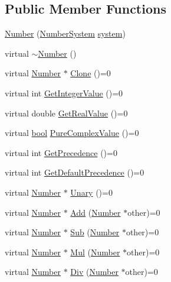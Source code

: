 \subsection*{Public Member Functions}
\begin{DoxyCompactItemize}
\item 
\hyperlink{structNumber_afd3c2f9b4b288e339f741a6e4ae54593}{Number} (\hyperlink{numb_8h_a1475a201d2346881ce88dfbacf628c7d}{Number\+System} \hyperlink{structNumber_a2ceda5601c42288626e76b06878e7476}{system})
\item 
virtual \hyperlink{structNumber_abafeb830a1397e50435815a183228739}{$\sim$\+Number} ()
\item 
virtual \hyperlink{structNumber}{Number} $\ast$ \hyperlink{structNumber_af59101b8a549616be51212fa1c17785e}{Clone} ()=0
\item 
virtual int \hyperlink{structNumber_aa2c4b207ac557a8bdbc1cf5696d37160}{Get\+Integer\+Value} ()=0
\item 
virtual double \hyperlink{structNumber_a83da654d465f1344162ce8b8f8c564b9}{Get\+Real\+Value} ()=0
\item 
virtual \hyperlink{platform_8h_a1062901a7428fdd9c7f180f5e01ea056}{bool} \hyperlink{structNumber_a037b461c2c9189c00b11f395a325735d}{Pure\+Complex\+Value} ()=0
\item 
virtual int \hyperlink{structNumber_a283da553cc9b328c3805611f2d96523d}{Get\+Precedence} ()=0
\item 
virtual int \hyperlink{structNumber_a63541fd80102c9fc36f8f913446700df}{Get\+Default\+Precedence} ()=0
\item 
virtual \hyperlink{structNumber}{Number} $\ast$ \hyperlink{structNumber_a4283e401f772614fc566db78087cf860}{Unary} ()=0
\item 
virtual \hyperlink{structNumber}{Number} $\ast$ \hyperlink{structNumber_af38172a47d725f10b8586846cb06e8a4}{Add} (\hyperlink{structNumber}{Number} $\ast$other)=0
\item 
virtual \hyperlink{structNumber}{Number} $\ast$ \hyperlink{structNumber_ae64075f6f73ded559499d3156bde0bdb}{Sub} (\hyperlink{structNumber}{Number} $\ast$other)=0
\item 
virtual \hyperlink{structNumber}{Number} $\ast$ \hyperlink{structNumber_ab853199817c9cd4e43c43aaedc4eef35}{Mul} (\hyperlink{structNumber}{Number} $\ast$other)=0
\item 
virtual \hyperlink{structNumber}{Number} $\ast$ \hyperlink{structNumber_a63917f8ad27c63f6616107d480ef9b5e}{Div} (\hyperlink{structNumber}{Number} $\ast$other)=0
\item 

\end{DoxyCompactItemize}
